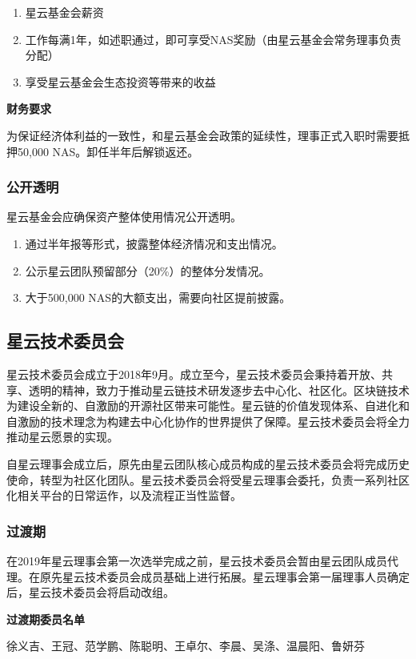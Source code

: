 \begin{enumerate}
	\item 星云基金会薪资
\item 工作每满1年，如述职通过，即可享受NAS奖励（由星云基金会常务理事负责分配）
\item 享受星云基金会生态投资等带来的收益
\end{enumerate}

\textbf{财务要求}

为保证经济体利益的一致性，和星云基金会政策的延续性，理事正式入职时需要抵押50,000 NAS。卸任半年后解锁返还。

\subsubsection{公开透明}
星云基金会应确保资产整体使用情况公开透明。
\begin{enumerate}
	\item 通过半年报等形式，披露整体经济情况和支出情况。
	\item 公示星云团队预留部分（20\%）的整体分发情况。
	\item 大于500,000 NAS的大额支出，需要向社区提前披露。 
\end{enumerate}

\subsection{星云技术委员会}
星云技术委员会成立于2018年9月。成立至今，星云技术委员会秉持着开放、共享、透明的精神，致力于推动星云链技术研发逐步去中心化、社区化。区块链技术为建设全新的、自激励的开源社区带来可能性。星云链的价值发现体系、自进化和自激励的技术理念为构建去中心化协作的世界提供了保障。星云技术委员会将全力推动星云愿景的实现。

自星云理事会成立后，原先由星云团队核心成员构成的星云技术委员会将完成历史使命，转型为社区化团队。星云技术委员会将受星云理事会委托，负责一系列社区化相关平台的日常运作，以及流程正当性监督。

\subsubsection{过渡期}
在2019年星云理事会第一次选举完成之前，星云技术委员会暂由星云团队成员代理。在原先星云技术委员会成员基础上进行拓展。星云理事会第一届理事人员确定后，星云技术委员会将启动改组。

\textbf{过渡期委员名单}

徐义吉、王冠、范学鹏、陈聪明、王卓尔、李晨、吴涤、温晨阳、鲁妍芬

